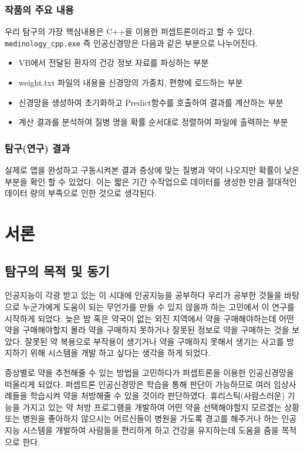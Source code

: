 \documentclass{report}
\begin{document}
\subsubsection{작품의 주요 내용}
우리 탐구의 가장 핵심내용은 C++을 이용한 퍼셉트론이라고 할 수 있다. \lstinline{medinology_cpp.exe} 즉 인공신경망은 다음과 같은 부분으로 나누어진다.

\begin{itemize}
  \item VB에서 전달된 환자의 건강 정보 자료를 파싱하는 부분
  \item weight.txt 파일의 내용을 신경망의 가중치, 편향에 로드하는 부분
  \item 신경망을 생성하여 초기화하고 Predict함수를 호출하여 결과를 계산하는 부분
  \item 계산 결과를 분석하여 질병 명을 확률 순서대로 정렬하여 파일에 출력하는 부분
\end{itemize}

\subsubsection{탐구(연구) 결과}
실제로 앱을 완성하고 구동시켜본 결과 증상에 맞는 질병과 약이 나오지만 확률이 낮은 부분을
 확인 할 수 있었다. 이는 짧은 기간 수작업으로 데이터를 생성한 만큼 절대적인 데이터 량의 부족으로 인한 것으로 생각된다.

\section{서론}
\subsection{탐구의 목적 및 동기}

인공지능이 각광 받고 있는 이 시대에 인공지능을 공부하다 우리가 공부한 것들을 바탕으로 누군가에게 도움이 되는 무언가를 만들 수 있지 않을까 하는 고민에서 이 연구를 시작하게 되었다. 늦은 밤 혹은 약국이 없는 외진 지역에서 약을 구매해야하는데 어떤 약을 구매해야할지 몰라 약을 구매하지 못하거나 잘못된 정보로 약을 구매하는 것을 보았다. 잘못된 약 복용으로 부작용이 생기거나 약을 구매하지 못해서 생기는 사고를 방지하기 위해 시스템을 개발 하고 싶다는 생각을 하게 되었다.

증상별로 약을 추천해줄 수 있는 방법을 고민하다가 퍼셉트론을 이용한 인공신경망을 떠올리게 되었다. 퍼셉트론 인공신경망은 학습을 통해 판단이 가능하므로 여러 임상사례들을 학습시켜 약을 처방해줄 수 있을 것이라 판단하였다. 휴리스틱(사람스러운) 기능을 가지고 있는 약 처방 프로그램을 개발하여 어떤 약을 선택해야할지 모르겠는 상황  또는 병원을 좋아하지 않으시는 어르신들이 병원을 가도록 경고를 해주거나 하는 인공지능 시스템을 개발하여 사람들을 편리하게 하고 건강을 유지하는데 도움을 줌을 목적으로 한다.
\end{document}
